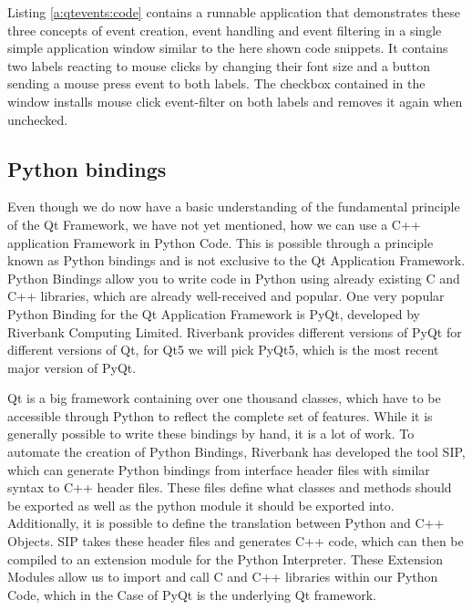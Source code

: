 

Listing \ref{a:qtevents:code} contains a runnable application that demonstrates
these three concepts of event creation, event handling and event filtering in a
single simple application window similar to the here shown code snippets. It
contains two labels reacting to mouse clicks by changing their font size and a
button sending a mouse press event to both labels. The checkbox contained in
the window installs mouse click event-filter on both labels and removes it
again when unchecked.
\cite{EventSystem,AnotherLookAtEvents,EventFilters}



\subsection{Python bindings}
\label{sec:fundamentals:qt:pyqt}

Even though we do now have a basic understanding of the fundamental principle
of the Qt Framework, we have not yet mentioned, how we can use a C++ application
Framework in Python Code. This is possible through a principle known as Python
bindings and is not exclusive to the Qt Application Framework. Python Bindings
allow you to write code in Python using already existing C and C++ libraries,
which are already well-received and popular. One very popular Python Binding for
the Qt Application Framework is PyQt, developed by Riverbank Computing Limited.
Riverbank provides different versions of PyQt for different versions of Qt, for
Qt5 we will pick PyQt5, which is the most recent major version of PyQt.
\cite{PyQtIntro}

Qt is a big framework containing over one thousand classes, which have to be
accessible through Python to reflect the complete set of features. While it is
generally possible to write these bindings by hand, it is a lot of work. To
automate the creation of Python Bindings, Riverbank has developed the tool SIP,
which can generate Python bindings from interface header files with similar
syntax to C++ header files. These files define what classes and methods should
be exported as well as the python module it should be exported into.
Additionally, it is possible to define the translation between Python and C++
Objects.  SIP takes these header files and generates C++ code, which can then be
compiled to an extension module for the Python Interpreter. These Extension
Modules allow us to import and call C and C++ libraries within our Python Code,
which in the Case of PyQt is the underlying Qt framework.
\cite{SipIntro, SipTut, ExtendingPython}

